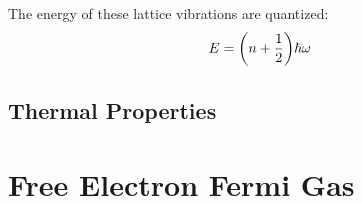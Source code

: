 \documentclass[12pt]{article}
\begin{document}
The energy of these lattice vibrations are quantized:
\begin{align*}
  E=\qty(n+\frac{1}{2})\hbar\omega
\end{align*}
\subsection{Thermal Properties}

\section{Free Electron Fermi Gas}
\end{document}
